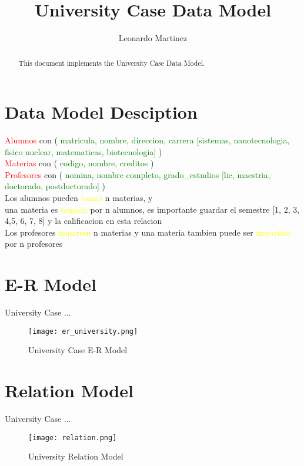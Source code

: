 \documentclass[10pt]{article}         %
\title{University Case Data Model}
\author{Leonardo Martinez}
\begin{document}
\maketitle

\begin{abstract}
This document implements the University Case Data Model.
\end{abstract}

\section{Data Model Desciption}


\textcolor{red}{Alumnos} con ( \textcolor{green}{matricula, nombre, direccion, carrera [sistemas, nanotecnologia, fisico nuclear, matematicas, biotecnologia]} )\\

\textcolor{red}{Materias} con ( \textcolor{green}{codigo, nombre, creditos} )\\

\textcolor{red}{Profesores } con ( \textcolor{green}{nomina, nombre completo, grado\_estudios [lic, maestria, doctorado, postdoctorado]} )\\



Los alumnos pueden \textcolor{yellow}{tomar} n materias, y 
\\
una materia es \textcolor{yellow}{tomada} por n alumnos, es importante guardar el semestre [1, 2, 3, 4,5, 6, 7, 8] y la calificacion en esta relacion
\\
Los profesores \textcolor{yellow}{imparten} n materias y una materia tambien puede ser \textcolor{yellow}{impartida} por n profesores



\section{E-R Model}

University Case ...
\begin{figure}[h]
     \texttt{[image: er\_university.png]}
     \caption{University Case E-R Model}
\end{figure}

\section{Relation Model}

University Case ...
\begin{figure}[h]
     \texttt{[image: relation.png]}
     \caption{University Relation Model}
\end{figure}
\end{document}

